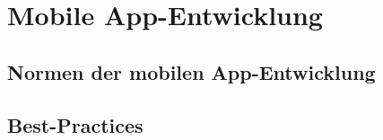 \section{Mobile App-Entwicklung}
\subsection{Normen der mobilen App-Entwicklung}
\subsection{Best-Practices}